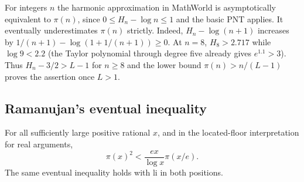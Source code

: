 For integers $n$ the harmonic approximation in MathWorld is asymptotically equivalent to $\pi(n)$, since $0\le H_n-\log n\le1$ and the basic PNT applies. It eventually underestimates $\pi(n)$ strictly. Indeed, $H_n-\log(n+1)$ increases by $1/(n+1)-\log(1+1/(n+1))\ge0$. At $n=8$, $H_8>2.717$ while $\log9<2.2$ (the Taylor polynomial through degree five already gives $e^{1.1}>3$). Thus $H_n-3/2>L-1$ for $n\ge8$ and the lower bound $\pi(n)>n/(L-1)$ proves the assertion once $L>1$.

\subsection{Ramanujan's eventual inequality}
\begin{theorem}\label{thm:growthram}
For all sufficiently large positive rational $x$, and in the located-floor interpretation for real arguments,
\[
 \pi(x)^2<\frac{ex}{\log x}\pi(x/e).
\]
The same eventual inequality holds with $\mathrm{li}$ in both positions.
\end{theorem}
